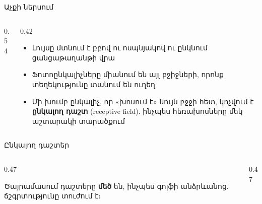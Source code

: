 \begin{frame}{Աչքի ներսում}
  \begin{columns}[c]
    \begin{column}{0.54\textwidth}
      \centering
      
    \end{column}
    \begin{column}{0.42\textwidth}
      \begin{itemize}
        \item Լույսը մտնում է բբով ու ոսպնյակով ու ընկնում ցանցաթաղանթի վրա
        \item<2-> Ֆոտոընկալիչները միանում են այլ բջիջների, որոնք տեղեկությունը տանում են ուղեղ
        \item<3-> Մի խումբ ընկալիչ, որ «խոսում է» նույն բջջի հետ, կոչվում է \textbf{ընկալող դաշտ} (receptive field). ինչպես հեռախոսները մեկ աշտարակի տարածքում
      \end{itemize}
    \end{column}
  \end{columns}
\end{frame}

\begin{frame}{Ընկալող դաշտեր}
  \centering
  \par\medskip
  \begin{columns}[T]
    \begin{column}{0.47\textwidth}
      \begin{card}[colback=lavender!35!cardwhite]
        \small Ծայրամասում դաշտերը \textbf{մեծ} են, ինչպես գոլֆի անձրևանոց. ճշգրտությունը տուժում է։
      \end{card}
    \end{column}
    \begin{column}{0.47\textwidth}
    \end{column}
  \end{columns}
\end{frame}

